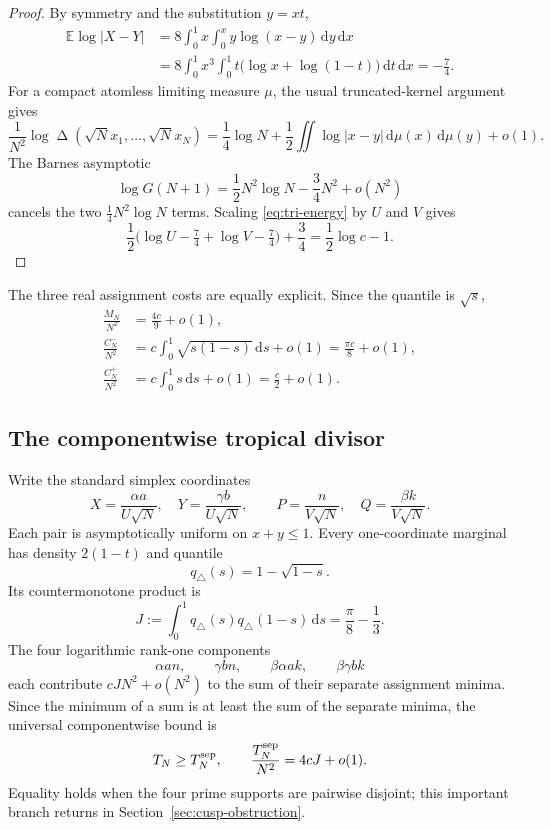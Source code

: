 \documentclass[11pt]{article}
\newcommand{\E}{\mathbb E}
\newcommand{\DeltaV}{\mathop{\Delta}\nolimits}
\newcommand{\dd}{\,\mathrm d}
\newcommand{\1}{\mathbf 1}
\theoremstyle{plain}
\theoremstyle{definition}
\theoremstyle{remark}
\begin{document}
\begin{proof}
By symmetry and the substitution $y=xt$,
\begin{align*}
 \E\log|X-Y|
 &=8\int_0^1x\int_0^x y\log(x-y)\dd y\dd x\\
 &=8\int_0^1x^3\int_0^1t\bigl(\log x+\log(1-t)\bigr)\dd t\dd x
 =-\frac74.
\end{align*}
For a compact atomless limiting measure $\mu$, the usual truncated-kernel
argument gives
\[
 \frac1{N^2}\log\DeltaV(\sqrt N x_1,\ldots,\sqrt N x_N)
 =\frac14\log N+\frac12\iint\log|x-y|\dd\mu(x)\dd\mu(y)+o(1).
\]
The Barnes asymptotic
\[
 \log G(N+1)=\frac12N^2\log N-\frac34N^2+o(N^2)
\]
cancels the two $\frac14N^2\log N$ terms.  Scaling
\eqref{eq:tri-energy} by $U$ and $V$ gives
\[
 \frac12\bigl(\log U-\tfrac74+\log V-\tfrac74\bigr)+\frac34
 =\frac12\log c-1.
\]
\end{proof}

The three real assignment costs are equally explicit.  Since the quantile is
$\sqrt{s}$,
\begin{align}
 \frac{M_N}{N^2}&=\frac{4c}{9}+o(1),\label{eq:tri-M}\\
 \frac{C_N^-}{N^2}&=c\int_0^1\sqrt{s(1-s)}\dd s+o(1)
 =\frac{\pi c}{8}+o(1),\label{eq:tri-Cminus}\\
 \frac{C_N^+}{N^2}&=c\int_0^1s\dd s+o(1)
 =\frac c2+o(1).\label{eq:tri-Cplus}
\end{align}

\subsection{The componentwise tropical divisor}

Write the standard simplex coordinates
\[
 X=\frac{\alpha a}{U\sqrt N},\quad
 Y=\frac{\gamma b}{U\sqrt N},\qquad
 P=\frac n{V\sqrt N},\quad
 Q=\frac{\beta k}{V\sqrt N}.
\]
Each pair is asymptotically uniform on $x+y\le1$.  Every one-coordinate
marginal has density $2(1-t)$ and quantile
\[
 q_\triangle(s)=1-\sqrt{1-s}.
\]
Its countermonotone product is
\begin{equation}\label{eq:J}
 J:=\int_0^1q_\triangle(s)q_\triangle(1-s)\dd s
 =\frac\pi8-\frac13.
\end{equation}
The four logarithmic rank-one components
\[
 \alpha an,\qquad \gamma bn,\qquad \beta\alpha ak,\qquad \beta\gamma bk
\]
each contribute $cJ N^2+o(N^2)$ to the sum of their separate assignment
minima.  Since the minimum of a sum is at least the sum of the separate
minima, the universal componentwise bound is
\begin{equation}\label{eq:Tsep-triangle}
 T_N\ge T_N^{\rm sep},\qquad
 \frac{T_N^{\rm sep}}{N^2}=4cJ+o(1).
\end{equation}
Equality holds when the four prime supports are pairwise disjoint; this
important branch returns in Section~\ref{sec:cusp-obstruction}.
\end{document}
